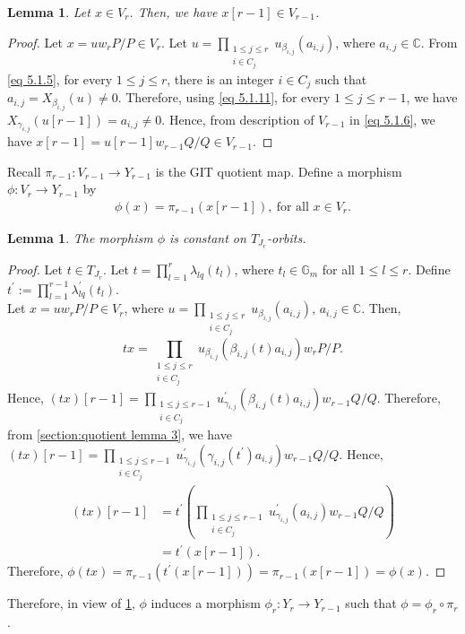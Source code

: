 \documentclass[12pt,reqno]{amsart}
\numberwithin{equation}{section}
\newtheorem{lemma}[theorem]{Lemma}
\theoremstyle{definition}
\begin{document}
\begin{lemma}\label{section: quotient lemma 4}
	Let $x\in V_{r}$. Then, we have $x[r-1]\in V_{r-1}$. 
\end{lemma}
\begin{proof}
	Let $x=uw_{r}P/P\in V_{r}$. Let $u=\prod_{\substack{1\leq j\leq r\\i\in C_{j}}}u_{\beta_{i,j}}(a_{i,j})$, where $a_{i,j}\in\mathbb{C}$. From \cref{eq 5.1.5}, for every $1\leq j\leq r$, there is an integer $i\in C_{j}$ such that $a_{i,j}=X_{\beta_{i,j}}(u)\neq 0$. Therefore, using \cref{eq 5.1.11}, for every $1\leq j\leq r-1$, we have $X_{\gamma_{i,j}}(u[r-1])=a_{i,j}\neq 0$. Hence, from description of $V_{r-1}$ in \cref{eq 5.1.6}, we have $x[r-1]=u[r-1]w_{r-1}Q/Q\in V_{r-1}$.
\end{proof}
Recall $\pi_{r-1}:V_{r-1}\longrightarrow Y_{r-1}$ is the GIT quotient map.
Define a morphism $\phi:V_{r}\longrightarrow Y_{r-1}$ by  \begin{align}\label{eq 5.1.8}
	\phi(x)=\pi_{r-1}(x[r-1]),\ \text{for all $x\in V_{r}$}.
\end{align}
\begin{lemma}\label{section:quotient:lemma 2}
	The morphism $\phi$ is constant on $T_{J_{r}}$-orbits.
\end{lemma}
\begin{proof}
	Let $t\in T_{J_{r}}$. Let  $t=\prod_{l=1}^{r}\lambda_{lq}(t_{l})$, where $t_{l}\in\mathbb{G}_{m}$ for all $1\leq l\leq r$. Define $t^{\prime}:=\prod_{l=1}^{r-1}\lambda^{\prime}_{lq}(t_{l})$.\\
	Let $x=uw_{r}P/P\in V_{r}$, where 
	$u=\prod_{\substack{1\leq j\leq r\\i\in C_{j}}}u_{\beta_{i,j}}(a_{i,j})$, $a_{i,j}\in\mathbb{C}$. Then, $$tx=\prod_{\substack{1\leq j\leq r\\i\in C_{j}}}u_{\beta_{i,j}}(\beta_{i,j}(t)a_{i,j})w_{r}P/P.$$
	Hence, $(tx)[r-1]=\prod_{\substack{1\leq j\leq r-1\\i\in C_{j}}}u^{\prime}_{\gamma_{i,j}}(\beta_{i,j}(t)a_{i,j})w_{r-1}Q/Q$.
	Therefore, from \cref{section:quotient lemma 3}, we have $(tx)[r-1]=\prod_{\substack{1\leq j\leq r-1\\i\in C_{j}}}u^{\prime}_{\gamma_{i,j}}(\gamma_{i,j}(t^{\prime})a_{i,j})w_{r-1}Q/Q$. Hence,
	\begin{align*}
		(tx)[r-1]&=t^{\prime}(\prod_{\substack{1\leq j\leq r-1\\i\in C_{j}}}u^{\prime}_{\gamma_{i,j}}(a_{i,j})w_{r-1}Q/Q)\\
		&=t^{\prime}(x[r-1]).
	\end{align*}
	Therefore, $\phi(tx)=\pi_{r-1}(t^{\prime}(x[r-1]))=\pi_{r-1}(x[r-1])=\phi(x)$.	
	\end{proof}
	Therefore, in view of \cref{section:quotient:lemma 2}, $\phi$ induces a morphism $\phi_{r}:Y_{r}\longrightarrow Y_{r-1}$ such that $\phi=\phi_{r}\circ\pi_{r}$.
\end{document}
